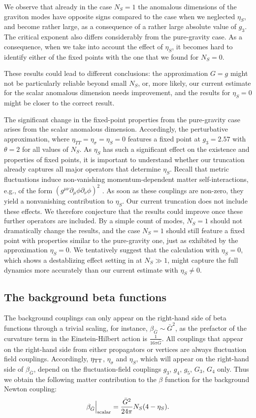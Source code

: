 \documentclass[11pt]{book} %
\newcommand{\be}{\begin{equation}}
\newcommand{\ee}{\end{equation}}
\numberwithin{equation}{chapter}
\begin{document}
We observe that already in the case $N_S=1$
the anomalous dimensions of the graviton modes
have opposite signs compared to the case when we neglected $\eta_S$,
and become rather large, as a consequence of a rather large absolute value of $g_3$.
The critical exponent also differs considerably from the pure-gravity case.
As a consequence, when we take into account the effect of
$\eta_S$, it becomes hard to identify either of the fixed points
with the one that we found for $N_S=0$.

These results could lead to different conclusions:
the approximation $G=g$ might not be particularly reliable
beyond small $N_S$, or, more likely, our current estimate
for the scalar anomalous dimension needs improvement,
and the results for $\eta_S=0$ might be closer to the correct result.

The significant change in the fixed-point properties from the pure-gravity case arises from
the scalar anomalous dimension.
Accordingly, the perturbative approximation, where $\eta_{TT}=\eta_{\sigma}=\eta_S=0$
features a fixed point at $g_3=2.57$ with $\theta=2$
for all values of $N_S$.
As $\eta_S$ has such a significant effect on the existence and properties of fixed points,
it is important to understand
whether our truncation already captures all major operators
that determine $\eta_S$. Recall that metric fluctuations
induce non-vanishing momentum-dependent
matter self-interactions, e.g., of the form $\left(g^{\mu \nu} \partial_{\mu} \phi \partial_{\nu}\phi\right)^2$ \cite{Eichhorn:2012va}. As soon as these couplings
are non-zero, they yield a nonvanishing contribution to $\eta_S$.
Our current truncation does not include these effects.
We therefore conjecture that the results could improve
once these further operators are included.
By a simple count of modes, $N_S=1$ should not
dramatically change the results, and the case $N_S=1$
should still feature a fixed point
with properties similar to the pure-gravity one,
just as exhibited by the approximation $\eta_S=0$.
We tentatively suggest that the calculation with $\eta_S=0$,
which shows a destablizing effect setting in at $N_S\gg1$,
might capture the full dynamics more accurately than our current estimate with $\eta_S \neq 0$.



\subsection{The background beta functions}
%
The background couplings can only appear on the right-hand side of beta functions through a trivial scaling,
for instance, $\beta_{\bar{G}} \sim \bar{G}^2$,
as the prefactor of the curvature term in the Einstein-Hilbert action is $\frac{1}{16 \pi \bar{G}}$.
All couplings that appear on the right-hand side from either propagators or vertices are always
fluctuation field couplings.
Accordingly, $\eta_{\rm TT}$, $\eta_{\sigma}$ and $\eta_S$,
which will appear on the right-hand side of $\beta_{\bar{G}}$,
depend on the fluctuation-field couplings $g_3$, $g_4$, $g_5$, $G_3$, $G_4$ only.
Thus we obtain the following matter contribution to the $\beta$ function for the background Newton coupling:
\be
\beta_{\bar{G}}\Big|_{\rm scalar}=\frac{\bar{G}^2}{24 \pi}N_S (4-\eta_S).
\ee
\end{document}
